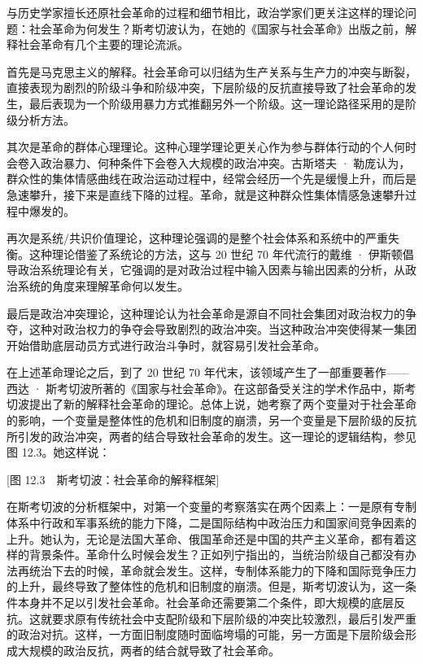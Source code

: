 与历史学家擅长还原社会革命的过程和细节相比，政治学家们更关注这样的理论问题：社会革命为何发生？斯考切波认为，在她的《国家与社会革命》出版之前，解释社会革命有几个主要的理论流派。

首先是马克思主义的解释。社会革命可以归结为生产关系与生产力的冲突与断裂，直接表现为剧烈的阶级斗争和阶级冲突，下层阶级的反抗直接导致了社会革命的发生，最后表现为一个阶级用暴力方式推翻另外一个阶级。这一理论路径采用的是阶级分析方法。

其次是革命的群体心理理论。这种心理学理论更关心作为参与群体行动的个人何时会卷入政治暴力、何种条件下会卷入大规模的政治冲突。古斯塔夫 · 勒庞认为，群众性的集体情感曲线在政治运动过程中，经常会经历一个先是缓慢上升，而后是急速攀升，接下来是直线下降的过程。革命，就是这种群众性集体情感急速攀升过程中爆发的。

再次是系统/共识价值理论，这种理论强调的是整个社会体系和系统中的严重失衡。这种理论借鉴了系统论的方法，这与 20 世纪 70 年代流行的戴维 · 伊斯顿倡导政治系统理论有关，它强调的是对政治过程中输入因素与输出因素的分析，从政治系统的角度来理解革命何以发生。

最后是政治冲突理论，这种理论认为社会革命是源自不同社会集团对政治权力的争夺，这种对政治权力的争夺会导致剧烈的政治冲突。当这种政治冲突使得某一集团开始借助底层动员方式进行政治斗争时，就容易引发社会革命。

在上述革命理论之后，到了 20 世纪 70 年代末，该领域产生了一部重要著作——西达 · 斯考切波所著的《国家与社会革命》。在这部备受关注的学术作品中，斯考切波提出了新的解释社会革命的理论。总体上说，她考察了两个变量对于社会革命的影响，一个变量是整体性的危机和旧制度的崩溃，另一个变量是下层阶级的反抗所引发的政治冲突，两者的结合导致社会革命的发生。这一理论的逻辑结构，参见图 12.3。她这样说：


[图 12.3　斯考切波：社会革命的解释框架]

在斯考切波的分析框架中，对第一个变量的考察落实在两个因素上：一是原有专制体系中行政和军事系统的能力下降，二是国际结构中政治压力和国家间竞争因素的上升。她认为，无论是法国大革命、俄国革命还是中国的共产主义革命，都有着这样的背景条件。革命什么时候会发生？正如列宁指出的，当统治阶级自己都没有办法再统治下去的时候，革命就会发生。这样，专制体系能力的下降和国际竞争压力的上升，最终导致了整体性的危机和旧制度的崩溃。但是，斯考切波认为，这一条件本身并不足以引发社会革命。社会革命还需要第二个条件，即大规模的底层反抗。这就要求原有传统社会中支配阶级和下层阶级的冲突比较激烈，最后引发严重的政治对抗。这样，一方面旧制度随时面临垮塌的可能，另一方面是下层阶级会形成大规模的政治反抗，两者的结合就导致了社会革命。

